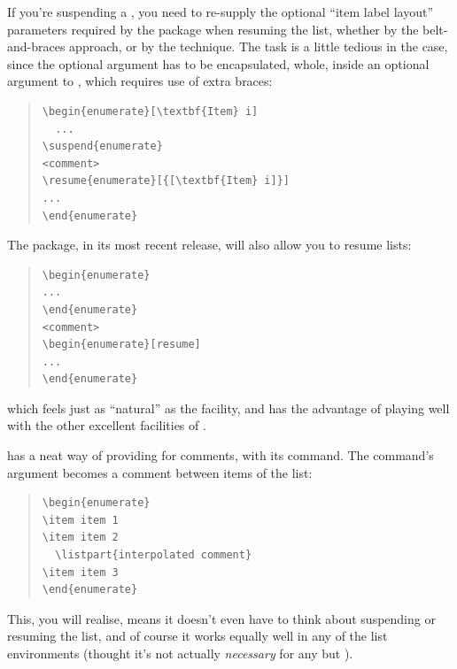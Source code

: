 If you're suspending a ,
you need to 
re-supply the optional ``item label layout'' parameters required by
the  package when resuming the list, whether by the
belt-and-braces approach, or by the 
 technique.  The task is a little tedious
in the  case, since the optional argument has to be
encapsulated, whole, inside an optional argument to ,
which requires use of extra braces:
\begin{quote}
\begin{verbatim}
\begin{enumerate}[\textbf{Item} i]
  ...
\suspend{enumerate}
<comment>
\resume{enumerate}[{[\textbf{Item} i]}]
...
\end{enumerate}
\end{verbatim}
\end{quote}
\nothtml{\noindent}The  package, in its most recent
release, will also allow you to resume lists:
\begin{quote}
\begin{verbatim}
\begin{enumerate}
...
\end{enumerate}
<comment>
\begin{enumerate}[resume]
...
\end{enumerate}
\end{verbatim}
\end{quote}
which feels just as ``natural'' as the  facility,
and has the advantage of playing well with the other excellent
facilities of .

 has a neat way of providing for comments, with its
 command.  The command's argument becomes a comment
between items of the list:
\begin{quote}
\begin{verbatim}
\begin{enumerate}
\item item 1
\item item 2
  \listpart{interpolated comment}
\item item 3
\end{enumerate}
\end{verbatim}
\end{quote}
This, you will realise, means it doesn't even have to think about
suspending or resuming the list, and of course it works equally well
in any of the list environments (thought it's not actually
\emph{necessary} for any but ).

